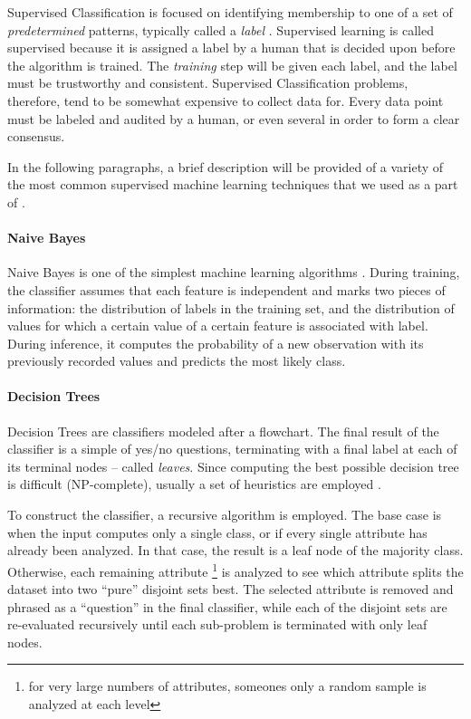Supervised Classification is focused on identifying membership to one of a set of \textit{predetermined} patterns, typically called a \textit{label} \cite{liu2007web}. Supervised learning is called supervised because it is assigned a label by a human that is decided upon before the algorithm is trained. The \textit{training} step will be given each label, and the label must be trustworthy and consistent. Supervised Classification problems, therefore, tend to be somewhat expensive to collect data for. Every data point must be labeled and audited by a human, or even several in order to form a clear consensus.

In the following paragraphs, a brief description will be provided of a variety of the most common supervised machine learning techniques that we used as a part of \CREATE. 

\paragraph{Naive Bayes}

Naive Bayes is one of the simplest machine learning algorithms \cite{liu2007web}. During training, the classifier assumes that each feature is independent and marks two pieces of information: the distribution of labels in the training set, and the distribution of values for which a certain value of a certain feature is associated with label. During inference, it computes the probability of a new observation with its previously recorded values and predicts the most likely class.

\paragraph{Decision Trees}

Decision Trees are classifiers modeled after a flowchart. The final result of the classifier is a simple of yes/no questions, terminating with a final label at each of its terminal nodes -- called \textit{leaves}. Since computing the best possible decision tree is difficult (NP-complete), usually a set of heuristics are employed \cite{liu2007web}.

To construct the classifier, a recursive algorithm is employed. The base case is when the input computes only a single class, or if every single attribute has already been analyzed. In that case, the result is a leaf node of the majority class. Otherwise, each remaining attribute \footnote{for very large numbers of attributes, someones only a random sample is analyzed at each level} is analyzed to see which attribute splits the dataset into two ``pure'' disjoint sets best. The selected attribute is removed and phrased as a ``question'' in the final classifier, while each of the disjoint sets are re-evaluated recursively until each sub-problem is terminated with only leaf nodes.

